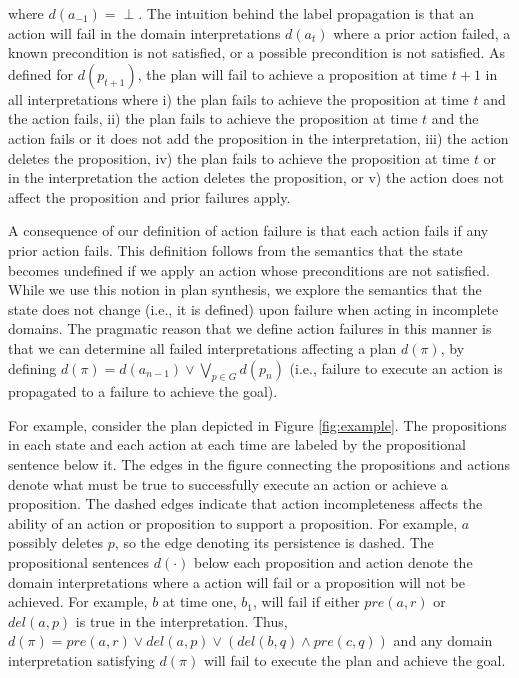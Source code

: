 \documentclass[letterpaper]{article}
\begin{document}
\noindent where $d({a}_{-1}) = \perp$. The intuition behind the label
propagation is that an action will fail  in the
domain interpretations $d({a}_t)$ where a prior action failed, a known
precondition is not satisfied, or a possible precondition is not satisfied. As defined for
$d(p_{t+1})$, the plan will fail to achieve a proposition at time $t+1$ in all
interpretations where i) the plan fails to achieve the proposition at time $t$ and the action fails, ii) the plan fails to achieve the proposition at
time $t$ and the action fails or it does not add the proposition in the
interpretation, iii) the action deletes the proposition, iv) the plan fails to
achieve the proposition at time $t$ or in the interpretation the action deletes
the proposition, or v) the action does not affect the proposition and  prior
failures  apply.             

A consequence of our definition of action failure is that each action fails if
any prior action fails.  This definition follows from the semantics that the
state becomes undefined if we apply an action whose preconditions are not
satisfied.  While we use this notion in plan synthesis, we explore the semantics
that the state does not change (i.e., it is defined) upon failure when acting in
incomplete domains.  The pragmatic reason that we define action failures in this
manner is that we can determine all failed interpretations affecting a plan $d(\pi)$,
by defining $d(\pi) = d({a}_{n-1}) \vee \bigvee_{p \in G} d(p_n)$ (i.e.,
failure to execute an action is propagated to a
failure to achieve the goal). 


For example, consider the plan depicted in Figure \ref{fig:example}.  The
propositions in each state and each action at each time are labeled by the
propositional sentence below it. The edges in the figure connecting the
propositions and actions denote what must be true to successfully execute an
action or achieve a proposition.  The dashed edges indicate that action
incompleteness affects the ability of an action or proposition to support a
proposition.  For example, $a$ possibly deletes $p$, so the edge
denoting its persistence is dashed.  The propositional sentences  $d(\cdot)$
below each proposition and action denote the domain interpretations where a
action will fail or a proposition will not be achieved.  For example,
$b$ at time one, $b_1$, will fail if either
$pre(a, r)$ or $del(a,
p)$ is true in the interpretation.  Thus, $d(\pi) = 
pre(a, r) \vee  del(a, p) \vee (del(b, q) \wedge pre(c, q))$ and any domain interpretation satisfying
$d(\pi)$ will fail to execute the plan and achieve the goal.
\end{document}
